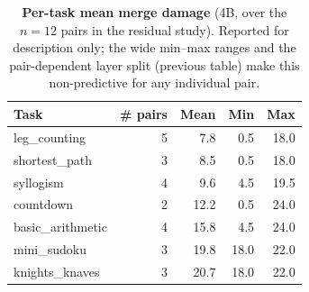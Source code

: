 \documentclass{article}
\begin{document}
\begin{table}[h]
\centering\small
\caption{\textbf{Per-task mean merge damage} (4B, over the $n{=}12$ pairs in the residual study).
Reported for description only; the wide min--max ranges and the pair-dependent layer split
(previous table) make this non-predictive for any individual pair.}
\label{tab:p4-taskdamage}
\begin{tabular}{lrrrr}
\toprule
Task & \# pairs & Mean & Min & Max\\
\midrule
leg\_counting    & 5 & 7.8  & 0.5  & 18.0\\
shortest\_path   & 3 & 8.5  & 0.5  & 18.0\\
syllogism        & 4 & 9.6  & 4.5  & 19.5\\
countdown        & 2 & 12.2 & 0.5  & 24.0\\
basic\_arithmetic& 4 & 15.8 & 4.5  & 24.0\\
mini\_sudoku     & 3 & 19.8 & 18.0 & 22.0\\
knights\_knaves  & 3 & 20.7 & 18.0 & 22.0\\
\bottomrule
\end{tabular}
\end{table}

\clearpage

\end{document}
